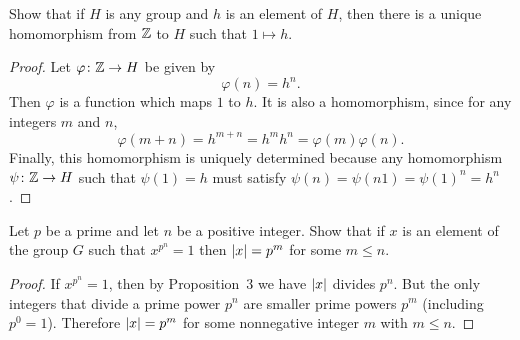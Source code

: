  Show that if $H$ is any group and $h$ is an element of
$H$, then there is a unique homomorphism from $\mathbb{Z}$ to $H$ such that
$1\mapsto h$.
\begin{proof}
  Let $\varphi\colon\mathbb{Z}\to H$ be given by
  \begin{equation*}
    \varphi(n) = h^n.
  \end{equation*}
  Then $\varphi$ is a function which maps $1$ to $h$. It is also a
  homomorphism, since for any integers $m$ and $n$,
  \begin{equation*}
    \varphi(m + n) = h^{m+n} = h^mh^n = \varphi(m)\varphi(n).
  \end{equation*}
  Finally, this homomorphism is uniquely determined because any
  homomorphism $\psi\colon\mathbb{Z}\to H$ such that $\psi(1) = h$ must
  satisfy $\psi(n) = \psi(n1) = \psi(1)^n = h^n$.
\end{proof}

 Let $p$ be a prime and let $n$ be a positive
integer. Show that if $x$ is an element of the group $G$ such that
$x^{p^n} = 1$ then $\lvert{x}\rvert = p^m$ for some $m\leq n$.
\begin{proof}
  If $x^{p^n} = 1$, then by Proposition~3 we have $\lvert{x}\rvert$ divides
  $p^n$. But the only integers that divide a prime power $p^n$ are
  smaller prime powers $p^m$ (including $p^0 = 1$). Therefore
  $\lvert{x}\rvert = p^m$ for some nonnegative integer $m$ with $m\leq n$.
\end{proof}



